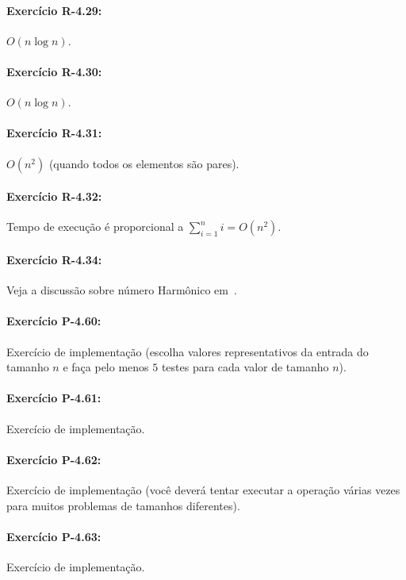 \paragraph{Exercício R-4.29:}
$O(n \log n)$.

\paragraph{Exercício R-4.30:}
$O(n \log n)$.

\paragraph{Exercício R-4.31:}
$O(n^2)$ (quando todos os elementos são pares).

\paragraph{Exercício R-4.32:}
Tempo de execução é proporcional a $\sum_{i = 1}^{n} i = O(n^2)$.

\paragraph{Exercício R-4.34:}
Veja a discussão sobre número Harmônico em~\cite{GoodrichEtAl2014}.

\paragraph{Exercício P-4.60:}
Exercício de implementação (escolha valores representativos da entrada do tamanho $n$ e faça pelo menos $5$ testes para cada valor de tamanho $n$).

\paragraph{Exercício P-4.61:}
Exercício de implementação.

\paragraph{Exercício P-4.62:}
Exercício de implementação (você deverá tentar executar a operação várias vezes para muitos problemas de tamanhos diferentes).

\paragraph{Exercício P-4.63:}
Exercício de implementação.


